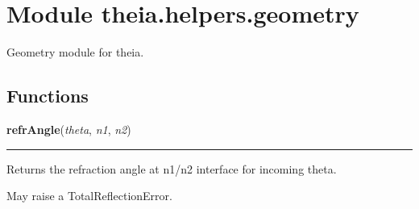 %
%
%


\section{Module theia.helpers.geometry}

    \label{theia:helpers:geometry}
Geometry module for theia.



  \subsection{Functions}

    \label{theia:helpers:geometry:refrAngle}

    \vspace{0.5ex}

\hspace{.8\funcindent}\begin{boxedminipage}{\funcwidth}

    \raggedright \textbf{refrAngle}(\textit{theta}, \textit{n1}, \textit{n2})

    \vspace{-1.5ex}

    \rule{\textwidth}{0.5\fboxrule}
\setlength{\parskip}{2ex}
    Returns the refraction angle at n1/n2 interface for incoming theta.

    May raise a TotalReflectionError.

\setlength{\parskip}{1ex}
    \end{boxedminipage}

    \label{theia:helpers:geometry:linePlaneInter}


